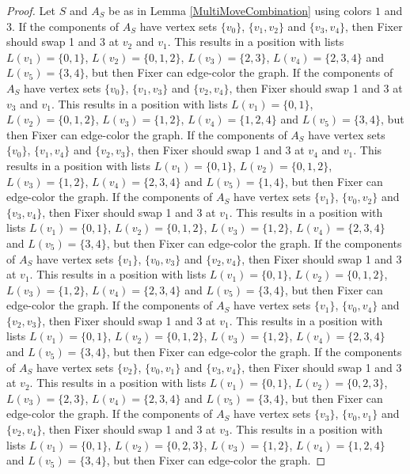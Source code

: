 \documentclass[12pt]{amsart}
\theoremstyle{plain}
\theoremstyle{definition}
\theoremstyle{remark}
\begin{document}
\begin{proof}
Let $S$ and $A_S$ be as in Lemma \ref{MultiMoveCombination} using colors $1$ and $3$. If the components of $A_S$ have vertex sets $\{v_0\}$, $\{v_1, v_2\}$ and $\{v_3, v_4\}$, then Fixer should swap 1 and 3 at $v_2$ and $v_1$. This results in a position with lists $L(v_1) = \{0, 1\}$, $L(v_2) = \{0, 1, 2\}$, $L(v_3) = \{2, 3\}$, $L(v_4) = \{2, 3, 4\}$ and $L(v_5) = \{3, 4\}$, but then Fixer can edge-color the graph.
If the components of $A_S$ have vertex sets $\{v_0\}$, $\{v_1, v_3\}$ and $\{v_2, v_4\}$, then Fixer should swap 1 and 3 at $v_3$ and $v_1$. This results in a position with lists $L(v_1) = \{0, 1\}$, $L(v_2) = \{0, 1, 2\}$, $L(v_3) = \{1, 2\}$, $L(v_4) = \{1, 2, 4\}$ and $L(v_5) = \{3, 4\}$, but then Fixer can edge-color the graph.
If the components of $A_S$ have vertex sets $\{v_0\}$, $\{v_1, v_4\}$ and $\{v_2, v_3\}$, then Fixer should swap 1 and 3 at $v_4$ and $v_1$. This results in a position with lists $L(v_1) = \{0, 1\}$, $L(v_2) = \{0, 1, 2\}$, $L(v_3) = \{1, 2\}$, $L(v_4) = \{2, 3, 4\}$ and $L(v_5) = \{1, 4\}$, but then Fixer can edge-color the graph.
If the components of $A_S$ have vertex sets $\{v_1\}$, $\{v_0, v_2\}$ and $\{v_3, v_4\}$, then Fixer should swap 1 and 3 at $v_1$. This results in a position with lists $L(v_1) = \{0, 1\}$, $L(v_2) = \{0, 1, 2\}$, $L(v_3) = \{1, 2\}$, $L(v_4) = \{2, 3, 4\}$ and $L(v_5) = \{3, 4\}$, but then Fixer can edge-color the graph.
If the components of $A_S$ have vertex sets $\{v_1\}$, $\{v_0, v_3\}$ and $\{v_2, v_4\}$, then Fixer should swap 1 and 3 at $v_1$. This results in a position with lists $L(v_1) = \{0, 1\}$, $L(v_2) = \{0, 1, 2\}$, $L(v_3) = \{1, 2\}$, $L(v_4) = \{2, 3, 4\}$ and $L(v_5) = \{3, 4\}$, but then Fixer can edge-color the graph.
If the components of $A_S$ have vertex sets $\{v_1\}$, $\{v_0, v_4\}$ and $\{v_2, v_3\}$, then Fixer should swap 1 and 3 at $v_1$. This results in a position with lists $L(v_1) = \{0, 1\}$, $L(v_2) = \{0, 1, 2\}$, $L(v_3) = \{1, 2\}$, $L(v_4) = \{2, 3, 4\}$ and $L(v_5) = \{3, 4\}$, but then Fixer can edge-color the graph.
If the components of $A_S$ have vertex sets $\{v_2\}$, $\{v_0, v_1\}$ and $\{v_3, v_4\}$, then Fixer should swap 1 and 3 at $v_2$. This results in a position with lists $L(v_1) = \{0, 1\}$, $L(v_2) = \{0, 2, 3\}$, $L(v_3) = \{2, 3\}$, $L(v_4) = \{2, 3, 4\}$ and $L(v_5) = \{3, 4\}$, but then Fixer can edge-color the graph.
If the components of $A_S$ have vertex sets $\{v_3\}$, $\{v_0, v_1\}$ and $\{v_2, v_4\}$, then Fixer should swap 1 and 3 at $v_3$. This results in a position with lists $L(v_1) = \{0, 1\}$, $L(v_2) = \{0, 2, 3\}$, $L(v_3) = \{1, 2\}$, $L(v_4) = \{1, 2, 4\}$ and $L(v_5) = \{3, 4\}$, but then Fixer can edge-color the graph.

\end{proof}
\end{document}
